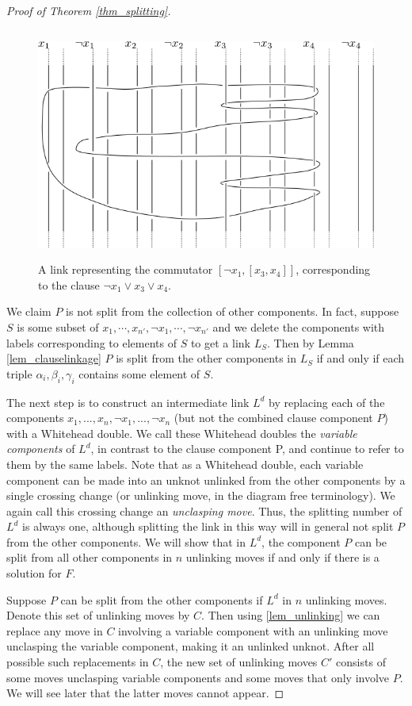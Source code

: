 \documentclass[12pt]{amsart}
\theoremstyle{definition}
\theoremstyle{remark}
\begin{document}
\begin{proof}[Proof of Theorem \ref{thm_splitting}]
\begin{figure}[ht]
\centering
\includegraphics[height=3in]{satclauseexample2.png}
\caption{A link representing the commutator $[\neg x_1,[x_3,x_4]]$, corresponding to the clause $ \neg x_1 \vee x_3 \vee x_4$.}
\label{fig_clauselink2}
\end{figure}

We claim $P$ is not split from the collection of other components. In fact, suppose $S$ is some subset of $x_1, \cdots, x_{n'}, \neg x_1, \cdots , \neg x_{n'}$ and we delete the components with labels corresponding to elements of $S$ to get a link $L_S$.  Then by Lemma \ref{lem_clauselinkage} $P$ is split from the other components in $L_S$ if and only if each triple $\alpha_i,\beta_i,\gamma_i$ contains some element of $S$.

The next step is to construct an intermediate link $L^d$ by replacing each of the components $x_1, ..., x_n, \neg x_1, ..., \neg x_n$ (but not the combined clause component $P$) with a Whitehead double.  We call these Whitehead doubles the \emph{variable components} of $L^d$, in contrast to the clause component P, and continue to refer to them by the same labels.  Note that as a Whitehead double, each variable component can be made into an unknot unlinked from the other components by a single crossing change (or unlinking move, in the diagram free terminology).  We again call this crossing change an \emph{unclasping move}.  Thus, the splitting number of $L^d$ is always one, although splitting the link in this way will in general not split $P$ from the other components.  We will show that in $L^d$, the component $P$ can be split from all other components in $n$ unlinking moves if and only if there is a solution for $F$.

Suppose $P$ can be split from the other components if $L^d$ in $n$ unlinking moves. Denote this set of unlinking moves by $C$. Then using \ref{lem_unlinking} we can replace any move in $C$ involving a variable component with an unlinking move unclasping the variable component, making it an unlinked unknot.  After all possible such replacements in $C$, the new set of unlinking moves $C'$ consists of some moves unclasping variable components and some moves that only involve $P$.  We will see later that the latter moves cannot appear.


\end{proof}
\end{document}
